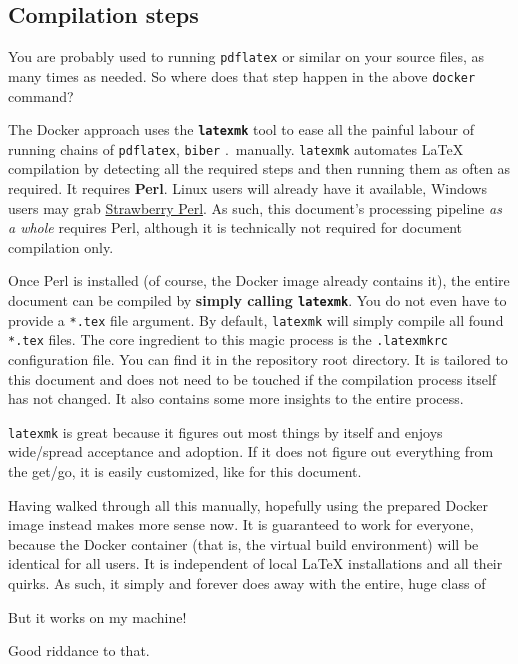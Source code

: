 \subsection{Compilation steps}

You are probably used to running \texttt{pdflatex} or similar on your source files,
as many times as needed.
So where does that step happen in the above \texttt{docker} command?

The Docker approach uses the \textbf{\texttt{latexmk}} tool to ease all the painful labour
of running chains of \texttt{pdflatex}, \texttt{biber} .\ manually.
\texttt{latexmk} automates \LaTeX{} compilation by detecting all the required
steps and then running them as often as required.
It requires \textbf{Perl}.
Linux users will already have it available, Windows users may grab
\href{http://strawberryperl.com/}{Strawberry Perl}.
As such, this document's processing pipeline \emph{as a whole} requires Perl,
although it is technically not required for document compilation only.

Once Perl is installed (of course, the Docker image already contains it),
the entire document can be compiled by \textbf{simply calling \texttt{latexmk}}.
You do not even have to provide a \texttt{*.tex} file argument.
By default, \texttt{latexmk} will simply compile all found \texttt{*.tex} files.
The core ingredient to this magic process is the \texttt{.latexmkrc} configuration file.
You can find it in the repository root directory.
It is tailored to this document and does not need to be touched if the compilation
process itself has not changed.
It also contains some more insights to the entire process.

\texttt{latexmk} is great because it figures out most things by itself and enjoys
wide\-/spread acceptance and adoption.
If it does not figure out everything from the get\-/go, it is easily customized,
like for this document.

Having walked through all this manually, hopefully using the prepared Docker image
instead makes more sense now.
It is guaranteed to work for everyone, because the Docker container (that is, the
virtual build environment) will be identical for all users.
It is independent of local \LaTeX{} installations and all their quirks.
As such, it simply and forever does away with the entire, huge class of
\begin{displayquote}
    But it works on my machine!
\end{displayquote}
Good riddance to that.

